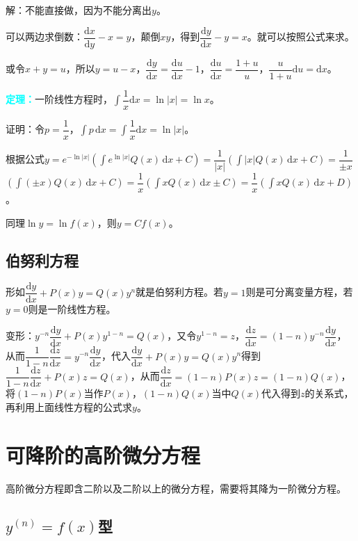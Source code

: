 \documentclass[UTF8, 12pt]{ctexart}
\begin{document}
解：不能直接做，因为不能分离出$y$。

可以两边求倒数：$\dfrac{\textrm{d}x}{\textrm{d}y}-x=y$，颠倒$xy$，得到$\dfrac{\textrm{d}y}{\textrm{d}x}-y=x$。就可以按照公式来求。

或令$x+y=u$，所以$y=u-x$，$\dfrac{\textrm{d}y}{\textrm{d}x}=\dfrac{\textrm{d}u}{\textrm{d}x}-1$，$\dfrac{\textrm{d}u}{\textrm{d}x}=\dfrac{1+u}{u}$，$\dfrac{u}{1+u}\textrm{d}u=\textrm{d}x$。

\textcolor{aqua}{\textbf{定理：}}一阶线性方程时，$\displaystyle{\int\dfrac{1}{x}\textrm{d}x}=\ln\vert x\vert=\ln x$。

证明：令$p=\dfrac{1}{x}$，$\int p\,\textrm{d}x=\displaystyle{\int\dfrac{1}{x}\textrm{d}x}=\ln\vert x\vert$。

根据公式$y=e^{-\ln\vert x\vert}(\int e^{\ln\vert x\vert}Q(x)\,\textrm{d}x+C)=\dfrac{1}{\vert x\vert}(\int\vert x\vert Q(x)\,\textrm{d}x+C)=\dfrac{1}{\pm x}$\\$(\int(\pm x)Q(x)\,\textrm{d}x+C)=\dfrac{1}{x}(\int xQ(x)\,\textrm{d}x\pm C)=\dfrac{1}{x}(\int xQ(x)\,\textrm{d}x+D)$。

同理$\ln y=\ln f(x)$，则$y=Cf(x)$。

\subsection{伯努利方程}

形如$\dfrac{\textrm{d}y}{\textrm{d}x}+P(x)y=Q(x)y^n$就是伯努利方程。若$y=1$则是可分离变量方程，若$y=0$则是一阶线性方程。

变形：$y^{-n}\dfrac{\textrm{d}y}{\textrm{d}x}+P(x)y^{1-n}=Q(x)$，又令$y^{1-n}=z$，$\dfrac{\textrm{d}z}{\textrm{d}x}=(1-n)y^{-n}\dfrac{\textrm{d}y}{\textrm{d}x}$，从而$\dfrac{1}{1-n}\dfrac{\textrm{d}z}{\textrm{d}x}=y^{-n}\dfrac{\textrm{d}y}{\textrm{d}x}$，代入$\dfrac{\textrm{d}y}{\textrm{d}x}+P(x)y=Q(x)y^n$得到$\dfrac{1}{1-n}\dfrac{\textrm{d}z}{\textrm{d}x}+P(x)z=Q(x)$，从而$\dfrac{\textrm{d}z}{\textrm{d}x}=(1-n)P(x)z=(1-n)Q(x)$，将$(1-n)P(x)$当作$P(x)$，$(1-n)Q(x)$当中$Q(x)$代入得到$z$的关系式，再利用上面线性方程的公式求$y$。

\section{可降阶的高阶微分方程}

高阶微分方程即含二阶以及二阶以上的微分方程，需要将其降为一阶微分方程。

\subsection{\texorpdfstring{$y^{(n)}=f(x)$}\ 型}
\end{document}
